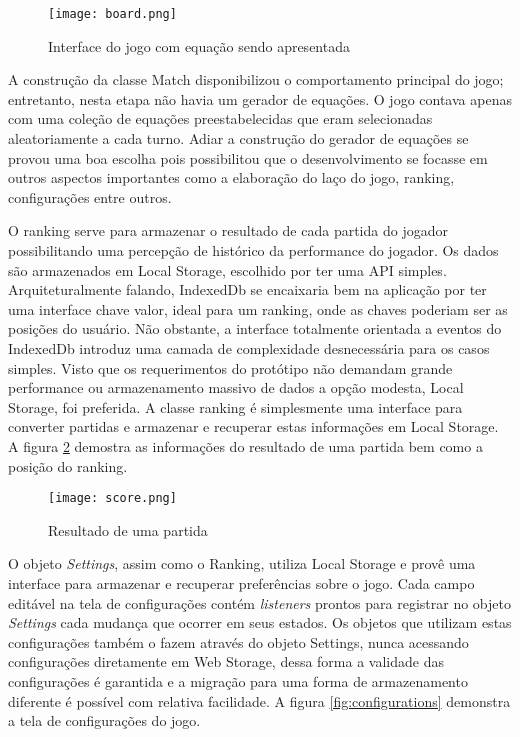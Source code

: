 \begin{figure}
    \centering
    \texttt{[image: board.png]}
	\caption{Interface do jogo com equação sendo apresentada}
    \label{fig:gameScreen}
\end{figure}

A construção da classe Match disponibilizou o comportamento principal do
jogo; entretanto, nesta etapa não havia um gerador de equações. O
jogo contava apenas com uma coleção de equações preestabelecidas
que eram selecionadas aleatoriamente a cada turno. Adiar a construção
do gerador de equações se provou uma boa escolha pois possibilitou
que o desenvolvimento se focasse em outros aspectos importantes como a
elaboração do laço do jogo, ranking, configurações entre outros.

O ranking serve para armazenar o resultado de cada partida do jogador
possibilitando uma percepção de histórico da performance do jogador.
Os dados são armazenados em Local Storage, escolhido por ter uma API
simples. Arquiteturalmente falando, IndexedDb se encaixaria bem na
aplicação por ter uma interface chave valor, ideal para um ranking,
onde as chaves poderiam ser as posições do usuário. Não obstante,
a interface totalmente orientada a eventos do IndexedDb introduz uma
camada de complexidade desnecessária para os casos simples. Visto que
os requerimentos do protótipo não demandam grande performance ou
armazenamento massivo de dados a opção modesta, Local Storage,
foi preferida. A classe ranking é simplesmente uma interface para
converter partidas e armazenar e recuperar estas informações em Local
Storage. A figura \ref{fig:placar} demostra as informações do resultado
de uma partida bem como a posição do ranking.

\begin{figure}
    \centering
    \texttt{[image: score.png]}
	\caption{Resultado de uma partida}
    \label{fig:placar}
\end{figure}

O objeto \textit{Settings}, assim como o Ranking, utiliza Local Storage
e provê uma interface para armazenar e recuperar preferências sobre
o jogo. Cada campo editável na tela de configurações contém
\textit{listeners} prontos para registrar no objeto \textit{Settings}
cada mudança que ocorrer em seus estados. Os objetos que utilizam estas
configurações também o fazem através do objeto Settings, nunca
acessando configurações diretamente em Web Storage, dessa forma a
validade das configurações é garantida e a migração para uma forma
de armazenamento diferente é possível com relativa facilidade.
A figura \ref{fig:configurations} demonstra a tela de configurações do 
jogo.

